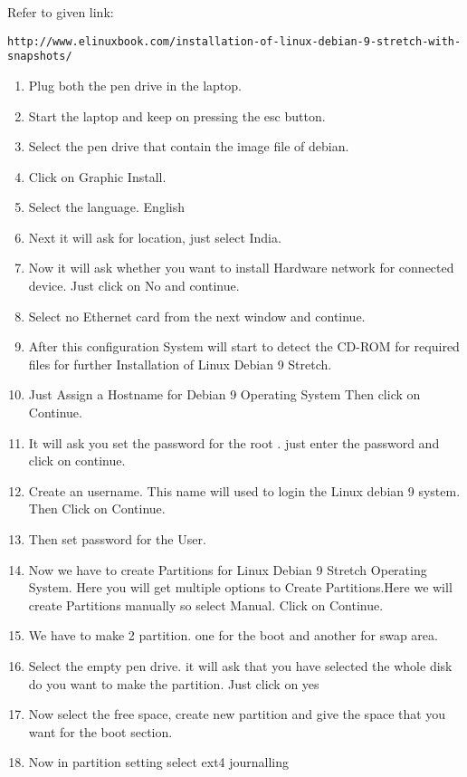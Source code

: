 \documentclass[journal,12pt,twocolumn]{IEEEtran}
\begin{document}
Refer to given link:
\begin{lstlisting}
http://www.elinuxbook.com/installation-of-linux-debian-9-stretch-with-snapshots/
\end{lstlisting}
\begin{enumerate}

\item Plug both the pen drive in the laptop.
\item Start the laptop and keep on pressing the esc button.
\item Select the pen drive that contain the image file of debian.
\item Click on Graphic Install.
\item Select the language. English
\item Next it will ask for location, just select India.
\item Now it will ask whether you want to install Hardware network for connected device. Just click on No and continue.
\item Select no Ethernet card from the next window and continue.
\item After this  configuration System will start to detect the CD-ROM for required files for further Installation of Linux Debian 9 Stretch.
\item Just Assign a Hostname for Debian 9 Operating System Then click on Continue.
\item It will ask you set the password for the root . just enter the password and click on continue.
\item Create an username. This name will used to login the Linux debian 9 system. Then Click on Continue.
\item Then set password for the User. 
\item Now we have to create Partitions for Linux Debian 9 Stretch Operating System. Here you will get multiple options to Create Partitions.Here we will create Partitions manually so select Manual. Click on Continue.
\item We have to make 2 partition. one for the boot and another for swap area.
\item Select the empty pen drive. it will ask that you have selected the whole disk do you want to make the partition. Just click on yes 
\item  Now select the free space, create new partition and give the space that you want for the boot section.
\item Now in partition setting select ext4 journalling

\end{enumerate}
\end{document}
